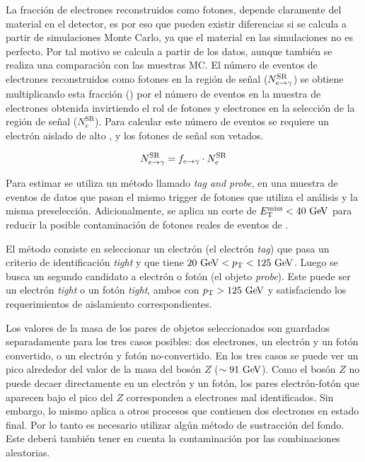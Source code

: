 La fracción de electrones reconstruidos como fotones, depende claramente del
material en el detector, es por eso que pueden existir diferencias si se calcula
a partir de simulaciones Monte Carlo, ya que el material en las simulaciones no
es perfecto. Por tal motivo se calcula a partir de los datos, aunque también se
realiza una comparación con las muestras MC.
El número de eventos de electrones reconstruidos como fotones en la región de
señal ($N_{e\rightarrow\gamma}^{\mathrm{SR}}$) se obtiene multiplicando esta fracción (\feg)
por el número de eventos en la muestra de electrones
obtenida invirtiendo el rol de fotones y electrones en la selección de la región
de señal ($N_e^{\mathrm{SR}}$). Para calcular este número de eventos se requiere
un electrón aislado de alto {\pt}, y los fotones de señal son
vetados.

\begin{equation}
  N_{e\rightarrow\gamma}^{\mathrm{SR}} = f_{e\rightarrow\gamma} \cdot N_e^{\mathrm{SR}}
\end{equation}

Para estimar {\feg} se utiliza un método llamado \emph{tag and probe}, en una muestra
de eventos de datos {\Zee} que pasan el mismo trigger de fotones que utiliza el
análisis y la misma preselección. Adicionalmente, se
aplica un corte de $\met < 40 \gev$ para reducir la posible contaminación de
fotones reales de eventos de {\wgam}.

El método consiste en seleccionar un electrón (el electrón \emph{tag}) que
pasa un criterio de identificación \emph{tight} y que tiene $20 \gev < \pt < 125 \gev$.
Luego se busca un segundo candidato a electrón o fotón
(el objeto \emph{probe}). Este puede ser un electrón \emph{tight} o un fotón
\emph{tight}, ambos con $\pt > 125\gev$ y satisfaciendo los requerimientos de
aislamiento correspondientes.

Los valores de la masa de los pares de objetos seleccionados son guardados
separadamente para los tres casos posibles: dos electrones, un electrón y un
fotón convertido, o un electrón y fotón no-convertido. En los tres casos se
puede ver un pico alrededor del valor de la masa del bosón $Z$ ($\sim 91
\gev$).
Como el bosón $Z$ no puede decaer directamente en un electrón y un fotón, los
pares electrón-fotón que aparecen bajo el pico del $Z$ corresponden a electrones
mal identificados. Sin embargo, lo mismo aplica a otros procesos que contienen
dos electrones en estado final.
Por lo tanto es necesario utilizar algún método de
sustracción del fondo. Este deberá también tener en cuenta la contaminación por
las combinaciones aleatorias.

